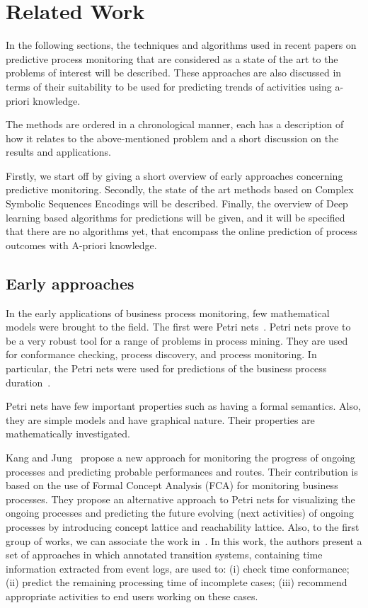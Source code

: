 \section{Related Work} %
\label{sec:related_work}


In the following sections, the techniques and algorithms used in recent papers on predictive process monitoring that are considered as a state of the art to the problems of interest will be described. These approaches are also discussed in terms of their suitability to be used for predicting trends of activities using a-priori knowledge.

The methods are ordered in a chronological manner, each has a description of how it relates to the above-mentioned problem and a short discussion on the results and applications.

Firstly, we start off by giving a short overview of early approaches concerning predictive monitoring.
Secondly, the state of the art methods based on Complex Symbolic Sequences Encodings will be described. 
Finally, the overview of Deep learning based algorithms for predictions will be given, and it will be specified that there are no algorithms yet, that encompass the online prediction of process outcomes with A-priori knowledge.



\subsection{Early approaches}

In the early applications of business process monitoring, few mathematical models were brought to the field. The first were Petri nets~\cite{doi:10.1142/S0218126698000043}. Petri nets prove to be a very robust tool for a range of problems in process mining. They are used for conformance checking, process discovery, and process monitoring. In particular, the Petri nets were used for predictions of the business process duration~\cite{Rogge-Solti2015PBP}. 

Petri nets have few important properties such as having a formal semantics. Also, they are simple models and have graphical nature. Their properties are mathematically investigated. 

Kang and Jung~\cite{doi:10.1108/02635571111137241} propose a new approach for monitoring the progress of ongoing processes and predicting probable performances and routes. Their contribution is based on the use of Formal Concept Analysis (FCA) for monitoring business processes. They propose an alternative approach to Petri nets for visualizing the ongoing processes and predicting the future evolving (next activities) of ongoing processes by introducing concept lattice and reachability lattice. Also, to the first group of works, we can associate the work in~\cite{DBLP:journals/is/AalstSS11}. In this work, the authors present a set of approaches in which annotated transition systems, containing time information extracted from event logs, are used to: (i) check time conformance;
(ii) predict the remaining processing time of incomplete cases; (iii) recommend appropriate activities to end users working on these cases. 

